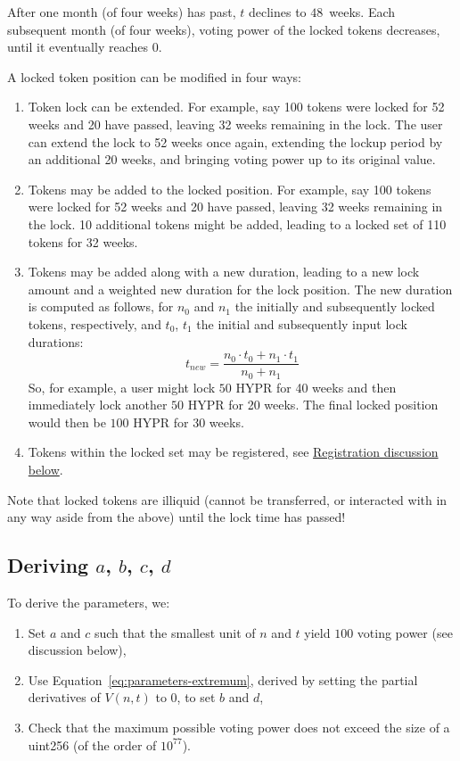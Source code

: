 \documentclass{article}
\begin{document}
After one month (of four weeks) has past, $t$ declines to $48$~weeks.
Each subsequent month (of four weeks), voting power of the locked tokens decreases, until it eventually reaches $0$.

A locked token position can be modified in four ways:
\begin{enumerate}
    \item Token lock can be extended.
       For example, say 100 tokens were locked for 52 weeks and 20 have passed, leaving 32 weeks remaining in the lock.
       The user can extend the lock to 52 weeks once again, extending the lockup period by an additional 20 weeks, and bringing voting power up to its original value.
    \item Tokens may be added to the locked position.
       For example, say 100 tokens were locked for 52 weeks and 20 have passed, leaving 32 weeks remaining in the lock.
       10 additional tokens might be added, leading to a locked set of 110 tokens for 32 weeks.
    \item Tokens may be added along with a new duration, leading to a new lock amount and a weighted new duration for the lock position.
       The new duration is computed as follows, for $n_0$ and $n_1$ the initially and subsequently locked tokens, respectively, and $t_0$, $t_1$ the initial and subsequently input lock durations:
       \begin{equation}
       t_{new} = \frac{n_0 \cdot t_0 + n_1 \cdot t_1}{n_0 + n_1}
       \end{equation}
       So, for example, a user might lock $50$ HYPR for 40 weeks and then immediately lock another $50$ HYPR for 20 weeks.
       The final locked position would then be $100$ HYPR for 30 weeks.
    \item Tokens within the locked set may be registered, see \hyperref[sec:registration]{Registration discussion below}.
\end{enumerate}

Note that locked tokens are illiquid (cannot be transferred, or interacted with in any way aside from the above) until the lock time has passed!

\subsection{Deriving $a$, $b$, $c$, $d$}\label{sec:deriving-parameters}

To derive the parameters, we:
\begin{enumerate}
	\item Set $a$ and $c$ such that the smallest unit of $n$ and $t$ yield $100$ voting power (see discussion below),
	\item Use Equation~\ref{eq:parameters-extremum}, derived by setting the partial derivatives of $V(n,t)$ to $0$, to set $b$ and $d$,
	\item Check that the maximum possible voting power does not exceed the size of a uint256 (of the order of $10^{77}$).
\end{enumerate}
\end{document}
